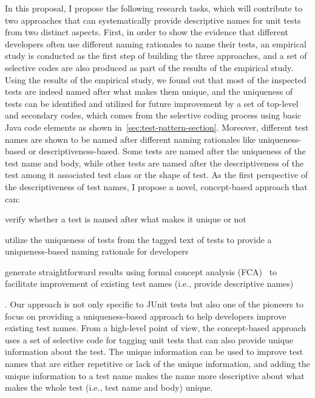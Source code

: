 In this proposal, I propose the following research tasks, which will contribute to two approaches that can systematically provide descriptive names for unit tests from two distinct aspects.
%
First, in order to show the evidence that different developers often use different naming rationales to name their tests, an empirical study is conducted as the first step of building the three approaches, and a set of selective codes are also produced as part of the results of the empirical study.
%
Using the results of the empirical study, we found out that most of the inspected tests are indeed named after what makes them unique, and the uniqueness of tests can be identified and utilized for future improvement by a set of top-level and secondary codes, which comes from the selective coding process using basic Java code elements as shown in~\cref{sec:test-pattern-section}.
%
Moreover, different test names are shown to be named after different naming rationales like uniqueness-based or descriptiveness-based.
%
Some tests are named after the uniqueness of the test name and body, while other tests are named after the descriptiveness of the test among it associated test class or the shape of test.
%
As the first perspective of the descriptiveness of test names, I propose a novel, concept-based approach that can:
%
\begin{enumerate*}
\item verify whether a test is named after what makes it unique or not
\item utilize the uniqueness of tests from the tagged text of tests to provide a uniqueness-based naming rationale for developers
\item generate straightforward results using formal concept analysis (FCA)~\cite{ganter2012formal} to facilitate improvement of existing test names (i.e., provide descriptive names)
\end{enumerate*}.
%
Our approach is not only specific to JUnit tests but also one of the pioneers to focus on providing a uniqueness-based approach to help developers improve existing test names.
%
From a high-level point of view, the concept-based approach uses a set of selective code for tagging unit tests that can also provide unique information about the test.
%
The unique information can be used to improve test names that are either repetitive or lack of the unique information, and adding the unique information to a test name makes the name more descriptive about what makes the whole test (i.e., test name and body) unique.


